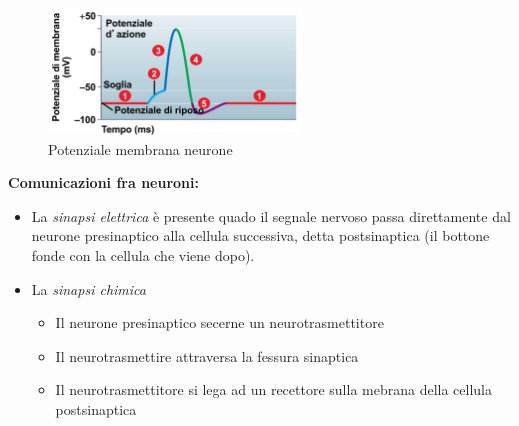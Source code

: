 \documentclass[a4paper]{article}
\begin{document}
\begin{center}
\begin{figure}[ht]
    \centering
    \includegraphics[width=0.6\textwidth]{./grafico_potenziale_membrana_neurone.png}
    \caption{Potenziale membrana neurone}
\end{figure}
\end{center}

\pagebreak

\textbf{Comunicazioni fra neuroni:}



\begin{itemize}
    \item  La \textit{sinapsi elettrica} è presente quado il segnale nervoso passa direttamente dal
    neurone presinaptico alla cellula successiva, detta postsinaptica (il bottone fonde con la cellula che viene dopo).
    \item La \textit{sinapsi chimica}
    \begin{itemize}
        \item Il neurone presinaptico secerne un neurotrasmettitore
        \item Il neurotrasmettire attraversa la fessura sinaptica
        \item Il neurotrasmettitore si lega ad un recettore sulla mebrana della cellula postsinaptica
    \end{itemize}
\end{itemize}

\vspace{0.25cm}
\end{document}
